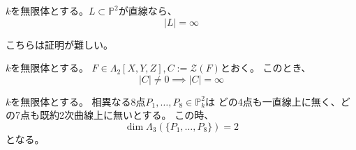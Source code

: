 \documentclass[a4]{article}
\newcommand{\proj}{\mathbb{P}}
\begin{document}
        \begin{Lemma}
            $k$を無限体とする。$L \subset \proj^2$が直線なら、
            \[ |L|=\infty \]
        \end{Lemma}

        こちらは証明が難しい。
        \begin{Prop}
            $k$を無限体とする。
            $F \in \Lambda_2[X,Y,Z], C:=\mathcal{Z}(F)$とおく。
            このとき、
            \[ |C| \neq 0 \implies |C|=\infty \]
        \end{Prop}

        \begin{Them}
            $k$を無限体とする。
            相異なる8点$P_1, \dots, P_8 \in \proj^2_k$は
            どの4点も一直線上に無く、どの7点も既約2次曲線上に無いとする。
            この時、\[ \dim\Lambda_3(\{P_1, \dots, P_8 \})=2 \]となる。
        \end{Them}
\end{document}
